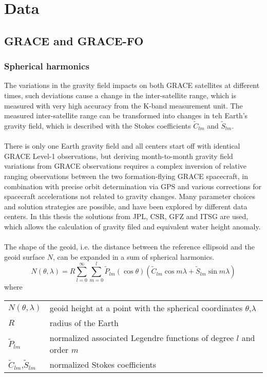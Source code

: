 \chapter{Data}
\section{GRACE and GRACE-FO}
\subsection{Spherical harmonics}
The variations in the gravity field impacts on both GRACE satellites at different times, such deviations cause a change in the inter-satellite range, which is measured with very high accuracy from the K-band measurement unit. The measured inter-satellite range can be transformed into changes in teh Earth's gravity field, which is described with the Stokes coefficients $\tilde{C}_{lm}$ and $\tilde{S}_{lm}$.\\\\
There is only one Earth gravity field and all centers start off with identical GRACE Level-1 observations, but deriving month-to-month gravity field variations from GRACE observations requires a complex inversion of relative ranging observations between the two formation-flying GRACE spacecraft, in combination with precise orbit determination via GPS and various corrections for spacecraft accelerations not related to gravity changes. Many parameter choices and solution strategies are possible, and have been explored by different data centers. In this thesis the solutions from JPL, CSR, GFZ and ITSG are used, which allows the calculation of gravity filed and equivalent water height anomaly. \\\\
The shape of the geoid, i.e. the distance between the reference ellipsoid and the geoid surface $N$, can be expanded in a sum of spherical harmonics.
\begin{equation}
	N(\theta, \lambda) = R \sum_{l=0}^{\infty} \sum_{m=0}^{l} \tilde{P}_{lm}(\cos \theta)(\tilde{C}_{lm} \cos m\lambda + \tilde{S}_{lm}\sin m\lambda)
\end{equation}
where
\begin{table}[htbp]
\begin{tabular}{ll}	
$N(\theta, \lambda)$	&  geoid height at a point with the spherical coordinates $\theta$,$\lambda$\\ 
$R$	&  radius of the Earth\\ 
$\tilde{P}_{lm}$	&  normalized associated Legendre functions of degree $l$ and order $m$\\ 
$\tilde{C}_{lm}$,$\tilde{S}_{lm}$	&  normalized Stokes coefficients\\ 
\end{tabular}
\end{table}
